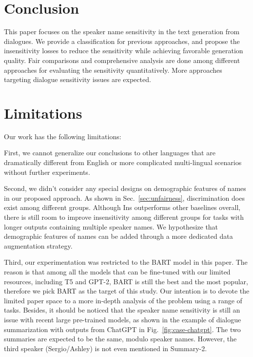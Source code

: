 \section{Conclusion}

This paper focuses on the speaker name sensitivity in the text generation from dialogues. We provide a classification for previous approaches, and propose the insensitivity losses to reduce the sensitivity while achieving favorable generation quality. Fair comparisons and comprehensive analysis are done among different approaches for evaluating the sensitivity quantitatively. 
More approaches targeting dialogue sensitivity issues are expected.

\section*{Limitations}

Our work has the following limitations:

First, we cannot generalize our conclusions to other languages that are dramatically different from English or more complicated multi-lingual scenarios without further experiments.

Second, we didn't consider any special designs on demographic features of names in our proposed approach. As shown in Sec.~\ref{sec:unfairness}, discrimination does exist among different groups. Although Ins outperforms other baselines overall, there is still room to improve insensitivity among different groups for tasks with longer outputs containing multiple speaker names. We hypothesize that demographic features of names can be added through a more dedicated data augmentation strategy.

Third, our experimentation was restricted to the BART model in this paper. The reason is that among all the models that can be fine-tuned with our limited resources, including T5 and GPT-2, BART is still the best and the most popular, therefore we pick BART as the target of this study. Our intention is to devote the limited paper space to a more in-depth analysis of the problem using a range of tasks. Besides, it should be noticed that the speaker name sensitivity is still an issue with recent large pre-trained models, as shown in the example of dialogue summarization with outputs from ChatGPT in Fig.~\ref{fig:case-chatgpt}. The two summaries are expected to be the same, modulo speaker names. However, the third speaker (Sergio/Ashley) is not even mentioned in Summary-2.

